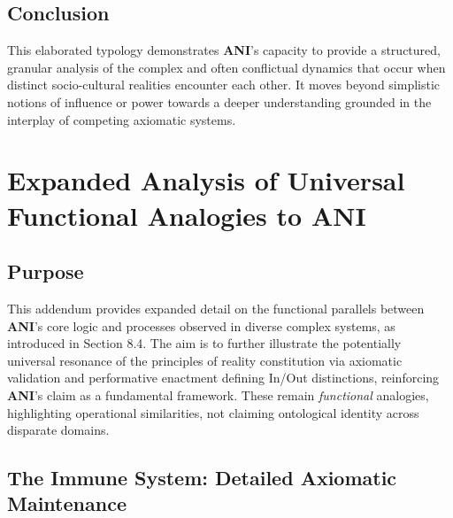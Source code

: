 \documentclass{article}
\newcommand{\ANI}{\textbf{ANI}}             %
\begin{document}
\subsection{Conclusion}

This elaborated typology demonstrates \ANI{}'s capacity to provide a structured, granular analysis of the complex and often conflictual dynamics that occur when distinct socio-cultural realities encounter each other. It moves beyond simplistic notions of influence or power towards a deeper understanding grounded in the interplay of competing axiomatic systems.

\section{Expanded Analysis of Universal Functional Analogies to ANI}

\subsection{Purpose}

This addendum provides expanded detail on the functional parallels between \ANI{}'s core logic and processes observed in diverse complex systems, as introduced in Section 8.4. The aim is to further illustrate the potentially universal resonance of the principles of reality constitution via axiomatic validation and performative enactment defining In/Out distinctions, reinforcing \ANI{}'s claim as a fundamental framework. These remain \textit{functional} analogies, highlighting operational similarities, not claiming ontological identity across disparate domains.

\subsection{The Immune System: Detailed Axiomatic Maintenance}
\end{document}
